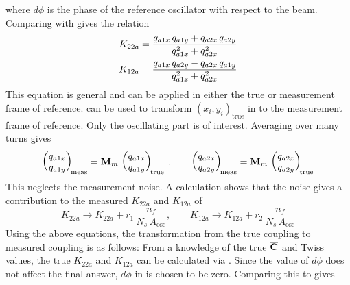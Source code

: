 where $d\phi$ is the phase of the reference oscillator with respect to
the beam.  Comparing  with  gives the relation
\begin{alignat}{1}
  K_{22a} &= \frac{q_{a1x} \, q_{a1y} + q_{a2x} \, q_{a2y}}{q_{a1x}^2 + q_{a2x}^2} \nonumber \\
  K_{12a} &= \frac{q_{a1x} \, q_{a2y} - q_{a2x} \, q_{a1y}}{q_{a1x}^2 + q_{a2x}^2} 
  \label{kaqqqq}
\end{alignat}
This equation is general and can be applied in either the true or
measurement frame of reference.   can be used to transform
$(x_i, y_i)_{\text{true}}$ in  to the measurement frame of
reference. Only the oscillating part is of interest.  Averaging over
many turns gives
\begin{equation}
  \begin{pmatrix}
    q_{a1x} \\
    q_{a1y}
  \end{pmatrix}_{\! \text{meas}}
  =  
  {\bf M}_m \, 
  \begin{pmatrix}
    q_{a1x} \\
    q_{a1y}
  \end{pmatrix}_{\! \text{true}}
  \> , \qquad
  \begin{pmatrix}
    q_{a2x} \\
    q_{a2y}
  \end{pmatrix}_{\! \text{meas}}
  =  
  {\bf M}_m \, 
  \begin{pmatrix}
    q_{a2x} \\
    q_{a2y}
  \end{pmatrix}_{\! \text{true}}
  \label{kkmkk}
\end{equation}
This neglects the measurement noise. A calculation shows that the noise gives a 
contribution to the measured $K_{22a}$ and $K_{12a}$ of
\begin{equation}
  K_{22a} \rightarrow K_{22a} + r_1 \, \frac{n_f}{N_s \, A_{\text{osc}}} 
  \comma \qquad
  K_{12a} \rightarrow K_{12a} + r_2 \, \frac{n_f}{N_s \, A_{\text{osc}}} 
  \label{kkrnn}
\end{equation}
Using the above equations, the transformation from the true
coupling to measured coupling is as follows: From a knowledge of the
true $\overline{{\bf C}}$ and Twiss values, the true $K_{22a}$ and
$K_{12a}$ can be calculated via . Since the value of $d\phi$
does not affect the final answer, $d\phi$ in  is chosen to
be zero.  Comparing this to  gives
